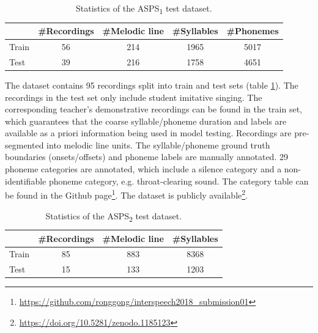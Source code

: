 \begin{table}[ht]
    \centering
    \begin{tabular}{l|cccc}
        \toprule
        & \#Recordings & \#Melodic line & \#Syllables & \#Phonemes \\
        \midrule
        Train           & 56 & 214 & 1965 & 5017 \\
        Test               & 39 & 216 & 1758 & 4651  \\
        \bottomrule
    \end{tabular}
    \caption{Statistics of the ASPS\textsubscript{1} test dataset.}
    \label{table:ch4:detailInfoDataset_asps_1}
\end{table}

The dataset contains 95 recordings split into train and test sets (table \ref{table:ch4:detailInfoDataset_asps_1}). The recordings in the test set only include student imitative singing. The corresponding teacher's demonstrative recordings can be found in the train set, which guarantees that the coarse syllable/phoneme duration and labels are available as a priori information being used in model testing. Recordings are pre-segmented into melodic line units. The syllable/phoneme ground truth boundaries (onsets/offsets) and phoneme labels are manually annotated. 29 phoneme categories are annotated, which include a silence category and a non-identifiable phoneme category, e.g. throat-clearing sound. The category table can be found in the Github page\footnote{\label{ft:github}\url{https://github.com/ronggong/interspeech2018_submission01}}. The dataset is publicly available\footnote{\url{https://doi.org/10.5281/zenodo.1185123}}.

\begin{table}[ht]
    \centering
    \begin{tabular}{l|ccc}
        \toprule
        & \#Recordings & \#Melodic line & \#Syllables \\
        \midrule
        Train           & 85 & 883 & 8368  \\
        Test               & 15 & 133 & 1203  \\
        \bottomrule
    \end{tabular}
    \caption{Statistics of the ASPS\textsubscript{2} test dataset.}
    \label{table:ch4:detail_info_jingju_dataset_asps_2}
\end{table}

